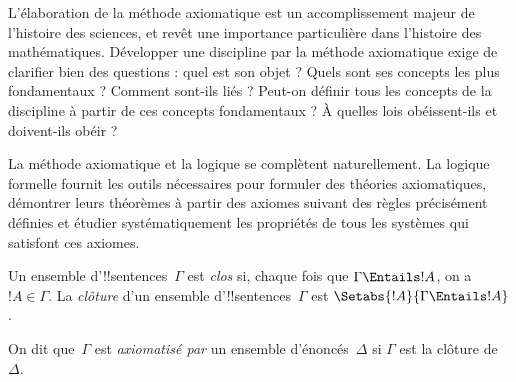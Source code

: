 \documentclass[../../../include/open-logic-section]{subfiles}
\begin{document}

\begin{explain}
L'élaboration de la méthode axiomatique est un accomplissement
majeur de l'histoire des sciences, et revêt une importance
particulière dans l'histoire des mathématiques. Développer une
discipline par la méthode axiomatique exige de clarifier bien des
questions : quel est son objet ? Quels sont ses concepts les plus
fondamentaux ? Comment sont-ils liés ? Peut-on définir tous les
concepts de la discipline à partir de ces concepts fondamentaux ?
À quelles lois obéissent-ils et doivent-ils obéir ?

La méthode axiomatique et la logique se complètent naturellement.
La logique formelle fournit les outils nécessaires pour formuler des
théories axiomatiques, démontrer leurs théorèmes à partir des axiomes
suivant des règles précisément définies et étudier systématiquement
les propriétés de tous les systèmes qui satisfont ces axiomes.
\end{explain}

\begin{defn}
Un ensemble d'!!{sentence}s~$\Gamma$ est \emph{clos} si, chaque fois
que $\Gamma \Entails !A$, on a $!A \in \Gamma$. La \emph{clôture}
d'un ensemble d'!!{sentence}s~$\Gamma$ est
$\Setabs{!A}{\Gamma \Entails !A}$.

On dit que~$\Gamma$ est \emph{axiomatisé par} un ensemble
d'énoncés~$\Delta$ si $\Gamma$ est la clôture de~$\Delta$.
\end{defn}
\end{document}
